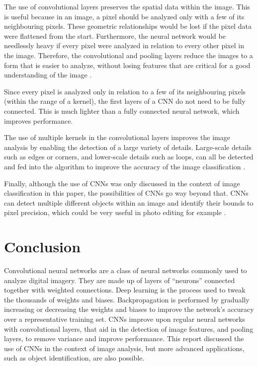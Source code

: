 ﻿\documentclass[12pt,a4paper,notitlepage]{article}
\begin{document}
The use of convolutional layers preserves the spatial data within the image. This is useful because in an image, a pixel should be analyzed only with a few of its neighbouring pixels. These geometric relationships would be lost if the pixel data were flattened from the start. Furthermore, the neural network would be needlessly heavy if every pixel were analyzed in relation to every other pixel in the image. Therefore, the convolutional and pooling layers reduce the images to a form that is easier to analyze, without losing features that are critical for a good understanding of the image \cite{saha_comprehensive_2018}.

Since every pixel is analyzed only in relation to a few of its neighbouring pixels (within the range of a kernel), the first layers of a CNN do not need to be fully connected. This is much lighter than a fully connected neural network, which improves performance. \cite{aghdam_guide_2017}

The use of multiple kernels in the convolutional layers improves the image analysis by enabling the detection of a large variety of details. Large-scale details such as edges or corners, and lower-scale details such as loops, can all be detected and fed into the algorithm to improve the accuracy of the image classification \cite{saha_comprehensive_2018}.

Finally, although the use of CNNs was only discussed in the context of image classification in this paper, the possibilities of CNNs go way beyond that. CNNs can detect multiple different objects within an image and identify their bounds to pixel precision, which could be very useful in photo editing for example \cite{brownlee_gentle_2019}.

\section{Conclusion}
Convolutional neural networks are a class of neural networks commonly used to analyze digital imagery. They are made up of layers of “neurons” connected together with weighted connections. Deep learning is the process used to tweak the thousands of weights and biases. Backpropagation is performed by gradually increasing or decreasing the weights and biases to improve the network's accuracy over a representative training set. CNNs improve upon regular neural networks with convolutional layers, that aid in the detection of image features, and pooling layers, to remove variance and improve performance. This report discussed the use of CNNs in the context of image analysis, but more advanced applications, such as object identification, are also possible.

\clearpage
\begin{flushleft}


\end{flushleft}
\end{document}
